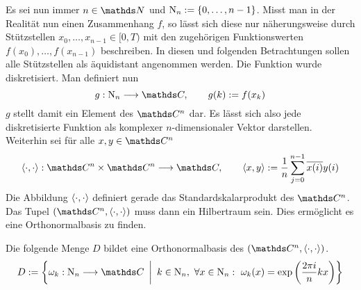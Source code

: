 			Es sei nun immer $n\in\SN$ und $\mathrm{N}_{n} := \left\{ 0,\ldots,n-1 \right\}$.
			Misst man in der Realität nun einen Zusammenhang $f$, so lässt sich diese nur näherungsweise durch Stützstellen $x_0,\ldots,x_{n-1} \in [0,T)$ mit den zugehörigen Funktionswerten $f(x_0),\ldots,f(x_{n-1})$ beschreiben.
			In diesen und folgenden Betrachtungen sollen alle Stützstellen als äquidistant angenommen werden.
			Die Funktion wurde diskretisiert.
			Man definiert nun
			\[ g:\mathrm{N}_n\longrightarrow\SC,\qquad g(k):=f(x_k) \]
			$g$ stellt damit ein Element des $\SC^n$ dar.
			Es lässt sich also jede diskretisierte Funktion als komplexer $n$-dimensionaler Vektor darstellen.
			Weiterhin sei für alle $x,y\in\SC^n$
			\[ \angleb{\cdot,\cdot}:\SC^n\times\SC^n\longrightarrow\SC,\qquad \angleb{x,y}:=\frac{1}{n}\sum_{j=0}^{n-1} \overline{x(i)}y(i) \]
			Die Abbildung $\left\langle \cdot,\cdot \right\rangle$ definiert gerade das Standardskalarprodukt des $\SC^n$.
			Das Tupel $\curvb{ \SC^n, \angleb{\cdot,\cdot} }$ muss dann ein Hilbertraum sein.
			Dies ermöglicht es eine Orthonormalbasis zu finden.
			\begin{proposition*}[Orthonormalbasis]
				Die folgende Menge $D$ bildet eine Orthonormalbasis des $\curvb{ \SC^n, \angleb{\cdot,\cdot} }$.
				\[ D := \set{\omega_k:\mathrm{N}_n\longrightarrow\SC}{ k\in\mathrm{N}_n,\ \forall x\in\mathrm{N}_n:\ \omega_k(x) = \exp\curvb{\frac{2\pi i}{n}kx} } \]

			\end{proposition*}
